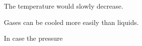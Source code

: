 The temperature would slowly decrease.

Gases can be cooled more easily than liquids.

In case the pressure